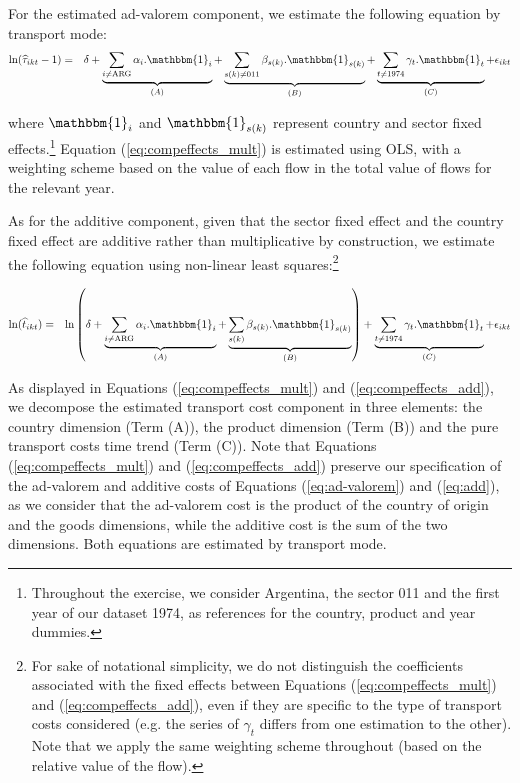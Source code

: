 \documentclass[a4paper,11pt]{article}
\begin{document}
For the estimated ad-valorem component, we estimate the following equation by transport mode:
\begin{eqnarray}
\ln(\widehat{\tau}_{ikt}-1)&=&\delta +\underbrace{\sum_{i \neq \text{ARG}}\alpha_i.\mathbbm{1}_i}_{(A)} + \underbrace{\sum_{s(k)\neq \text{011}}\beta_{s(k)}.\mathbbm{1}_{s(k)}}_{(B)} + \underbrace{\sum_{t \neq 1974}\gamma_t.\mathbbm{1}_t}_{(C)}+\epsilon_{ikt} \label{eq:compeffects_mult}
\end{eqnarray}

\noindent where $\mathbbm{1}_i$ and $\mathbbm{1}_{s(k)}$ represent country and sector fixed effects.\footnote{Throughout the exercise, we consider Argentina, the sector 011 and the first year of our dataset 1974, as references for the country, product and year dummies.}  Equation (\ref{eq:compeffects_mult}) is estimated using OLS, with a weighting scheme based on the value of each flow in the total value of flows for the relevant year.


As for the additive component, given that the sector fixed effect and the country fixed effect are additive rather than multiplicative by construction, we estimate the following equation using non-linear least squares:\footnote{For sake of notational simplicity, we do not distinguish the coefficients associated with the fixed effects between Equations (\ref{eq:compeffects_mult}) and (\ref{eq:compeffects_add}), even if they are specific to the type of transport costs considered (e.g. the series of $\gamma_t$ differs from one estimation to the other).
Note that we apply the same weighting scheme throughout (based on the relative value of the flow).}

\begin{eqnarray}
\ln(\widehat{t}_{ikt})&=&\ln\left( \delta + \underbrace{\sum_{i \neq \text{ARG}}  \alpha_i.\mathbbm{1}_i}_{(A)}+\underbrace{\sum_{s(k)}\beta_{s(k)}.\mathbbm{1}_{s(k)}}_{(B)}\right) + \underbrace{\sum_{t \neq 1974}\gamma_t.\mathbbm{1}_t}_{(C)}+\epsilon_{ikt} \label{eq:compeffects_add}
\end{eqnarray}


As displayed in Equations (\ref{eq:compeffects_mult}) and (\ref{eq:compeffects_add}), we decompose the estimated transport cost component in three elements: the country dimension (Term (A)), the product dimension (Term (B)) and the pure transport costs time trend (Term (C)).
Note that Equations (\ref{eq:compeffects_mult}) and (\ref{eq:compeffects_add}) preserve our specification of the ad-valorem and additive costs of Equations (\ref{eq:ad-valorem}) and (\ref{eq:add}), as we consider that the ad-valorem cost is the product of the country of origin and the goods dimensions, while the additive cost is the sum of the two dimensions. Both equations are estimated by transport mode.
\end{document}
